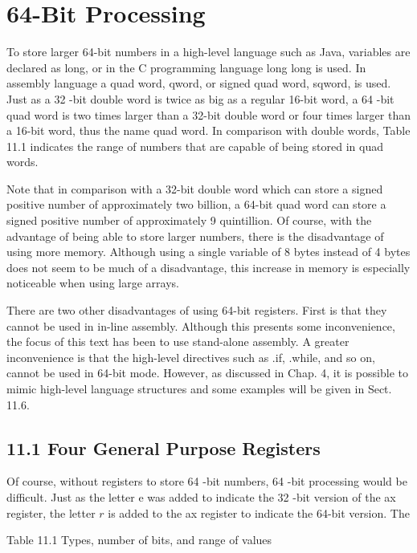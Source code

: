 \documentclass[10pt]{article}
\begin{document}
\section*{64-Bit Processing}
To store larger 64-bit numbers in a high-level language such as Java, variables are declared as long, or in the C programming language long long is used. In assembly language a quad word, qword, or signed quad word, sqword, is used. Just as a 32 -bit double word is twice as big as a regular 16-bit word, a 64 -bit quad word is two times larger than a 32-bit double word or four times larger than a 16-bit word, thus the name quad word. In comparison with double words, Table 11.1 indicates the range of numbers that are capable of being stored in quad words.

Note that in comparison with a 32-bit double word which can store a signed positive number of approximately two billion, a 64-bit quad word can store a signed positive number of approximately 9 quintillion. Of course, with the advantage of being able to store larger numbers, there is the disadvantage of using more memory. Although using a single variable of 8 bytes instead of 4 bytes does not seem to be much of a disadvantage, this increase in memory is especially noticeable when using large arrays.

There are two other disadvantages of using 64-bit registers. First is that they cannot be used in in-line assembly. Although this presents some inconvenience, the focus of this text has been to use stand-alone assembly. A greater inconvenience is that the high-level directives such as .if, .while, and so on, cannot be used in 64-bit mode. However, as discussed in Chap. 4, it is possible to mimic high-level language structures and some examples will be given in Sect. 11.6.

\subsection*{11.1 Four General Purpose Registers}
Of course, without registers to store 64 -bit numbers, 64 -bit processing would be difficult. Just as the letter e was added to indicate the 32 -bit version of the ax register, the letter $r$ is added to the ax register to indicate the 64-bit version. The

Table 11.1 Types, number of bits, and range of values
\end{document}
